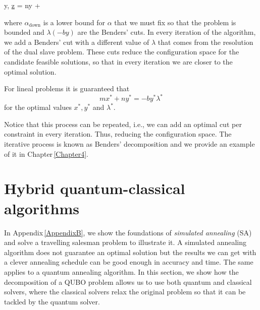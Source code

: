 \begin{tcolorbox}[colback=blue!5!white,colframe=blue!75!black,title=Master problem]
\begin{mini!}[2]
	{y, \alpha}{\underline{z} = ny + \alpha}{}{}{}
\end{mini!}
\end{tcolorbox}
where $\alpha_{\text{down}}$ is a lower bound for $\alpha$ that we must fix so that the problem is bounded and $\lambda(-by)$ are the Benders' cuts. In every iteration of the algorithm, we add a Benders' cut with a different value of $\lambda$ that comes from the resolution of the dual slave problem. These cuts reduce the configuration space for the candidate feasible solutions, so that in every iteration we are closer to the optimal solution.
\begin{tcolorbox}[colback=black!5!white,colframe=black!75!black,title=Strong Duality condition]
For lineal problems it is guaranteed that
\begin{equation}
    mx^{*} + ny^{*} =-by^{*}\lambda^{*}
\end{equation}
for the optimal values $x^{*},y^{*}$ and $\lambda^{*}$.
\end{tcolorbox}
 Notice that this process can be repeated, i.e., we can add an optimal cut per constraint in every iteration. Thus, reducing the configuration space. The iterative process is known as Benders' decomposition and we provide an example of it in Chapter\,\ref{Chapter4}.

\section{Hybrid quantum-classical algorithms}
In Appendix\,\ref{AppendixB}, we show the foundations of \textit{simulated annealing} (SA) and solve a travelling salesman problem to illustrate it. A simulated annealing algorithm does not guarantee an optimal solution but the results we can get with a clever annealing schedule can be good enough in accuracy and time. The same applies to a quantum annealing algorithm. In this section, we show how the decomposition of a QUBO problem allows us to use both quantum and classical solvers, where the classical solvers relax the original problem so that it can be tackled by the quantum solver.
